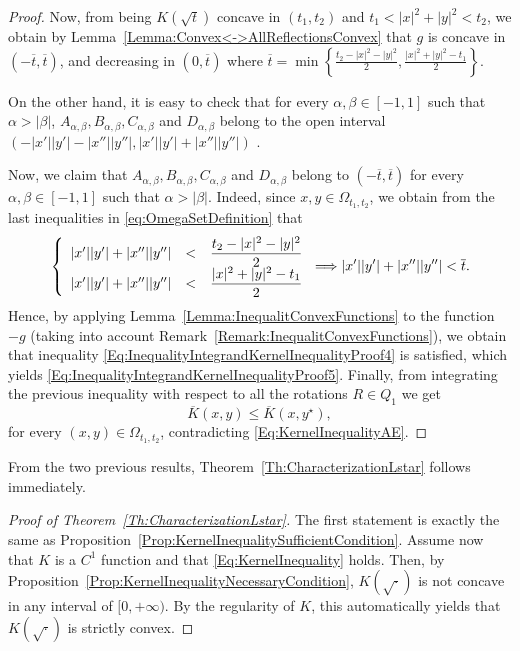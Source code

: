 \begin{proof}
Now, from being $K(\sqrt{t})$ concave in $(t_1,t_2)$ and $t_1<|x|^2+|y|^2<t_2$, we obtain by Lemma~\ref{Lemma:Convex<->AllReflectionsConvex} that $g$ is concave in $ \left( -\overline{t}, \overline{t}\right) $, and decreasing in $(0,\overline{t})$ where $\overline{t} = \min{\left\{\frac{t_2-|x|^2-|y|^2}{2},\frac{|x|^2+|y|^2-t_1}{2}\right\}}$.

On the other hand, it is easy to check that for every $\alpha, \beta \in [-1,1]$ such that $\alpha>|\beta|$, $A_{\alpha,\beta}, B_{\alpha,\beta}, C_{\alpha,\beta}$ and $D_{\alpha,\beta}$ belong to the open interval $(-|x'||y'|-|x''||y''|,|x'||y'|+|x''||y''|)$ .

Now, we claim that $A_{\alpha,\beta}, B_{\alpha,\beta}, C_{\alpha,\beta}$ and $D_{\alpha,\beta}$ belong to $(-\overline{t},\overline{t})$ for every $\alpha, \beta \in [-1,1]$ such that $\alpha>|\beta|$. Indeed, since $x,y \in \Omega_{t_1,t_2}$, we obtain from the last inequalities in \eqref{eq:OmegaSetDefinition} that
$$
\left\{\begin{array}{rcll}
|x'||y'|+|x''||y''|&<&\dfrac{t_2-|x|^2-|y|^2}{2}\\
|x'||y'|+|x''||y''|&<&\dfrac{|x|^2+|y|^2-t_1}{2}
\end{array} \right. \Longrightarrow  |x'||y'|+|x''||y''|<\overline{t}.
$$
Hence, by applying Lemma~\ref{Lemma:InequalitConvexFunctions} to the function $-g$ (taking into account Remark~\ref{Remark:InequalitConvexFunctions}), we obtain that inequality \eqref{Eq:InequalityIntegrandKernelInequalityProof4} is satisfied, which yields \eqref{Eq:InequalityIntegrandKernelInequalityProof5}. Finally, from integrating the previous inequality with respect to all the rotations $R\in Q_1$ we get $$ \overline{K}(x,y) \leq \overline{K}(x, y^\star),$$ for every $(x,y)\in \Omega_{t_1,t_2}$, contradicting \eqref{Eq:KernelInequalityAE}.
\end{proof}

From the two previous results, Theorem~\ref{Th:CharacterizationLstar} follows immediately.

\begin{proof}[Proof of Theorem~\ref{Th:CharacterizationLstar}]
	The first statement is exactly the same as Proposition~\ref{Prop:KernelInequalitySufficientCondition}. Assume now that $K$ is a $C^1$ function and that \eqref{Eq:KernelInequality} holds. Then, by Proposition~\ref{Prop:KernelInequalityNecessaryCondition}, $K(\sqrt{\cdot})$ is not concave in any interval of $[0,+\infty)$. By the regularity of $K$, this automatically yields that $K(\sqrt{\cdot})$ is strictly convex.
\end{proof}

